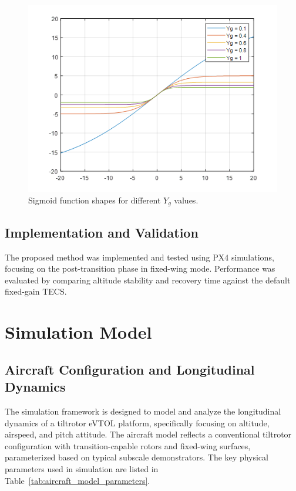 \documentclass[journal,article,submit,pdftex,moreauthors]{Definitions/mdpi}
\begin{document}
\begin{figure}[H]
    \centering
    \includegraphics[width=0.6\linewidth]{sigmoid_function_shapes.png}
    \caption{Sigmoid function shapes for different $Y_g$ values.}
    \label{fig:sigmoid_function_shapes}
\end{figure}

\subsection{Implementation and Validation}
The proposed method was implemented and tested using PX4 simulations, focusing on the post-transition phase in fixed-wing mode. Performance was evaluated by comparing altitude stability and recovery time against the default fixed-gain TECS.

\section{Simulation Model}
\subsection{Aircraft Configuration and Longitudinal Dynamics}
The simulation framework is designed to model and analyze the longitudinal dynamics of a tiltrotor eVTOL platform, specifically focusing on altitude, airspeed, and pitch attitude. The aircraft model reflects a conventional tiltrotor configuration with transition-capable rotors and fixed-wing surfaces, parameterized based on typical subscale demonstrators. The key physical parameters used in simulation are listed in Table~\ref{tab:aircraft_model_parameters}.
\end{document}
